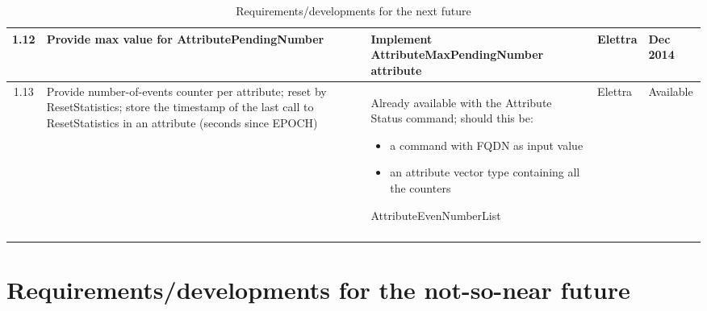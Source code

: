 \documentclass[11pt,a4paper]{article}
\begin{document}
\begin{longtable}{|c|p{6.0cm}|p{6.0cm}|p{1.0cm}|p{1.4cm}|}
	\hline
	1.12 &
	Provide max value for AttributePendingNumber &
	Implement AttributeMaxPendingNumber attribute &
	Elettra &
	Dec 2014 \\
	\hline
	1.13 &
	Provide number-of-events counter per attribute; reset by ResetStatistics;
	store the timestamp of the last call to ResetStatistics in an attribute
	(seconds since EPOCH) &
	Already available with the Attribute Status command; should this be:
	\begin{itemize}
		\item a command with FQDN as input value
		\item an attribute vector type containing all the counters
	\end{itemize}
	AttributeEvenNumberList &
	Elettra &
	Available\\
	\hline
	\caption{Requirements/developments for the next future}
	\label{tab:next-future}
\end{longtable}

\newpage

\section{Requirements/developments for the not-so-near future}
\end{document}
